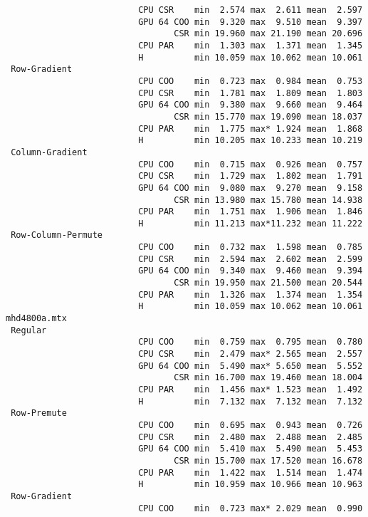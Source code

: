 \begin{verbatim}
                          CPU CSR    min  2.574 max  2.611 mean  2.597
                          GPU 64 COO min  9.320 max  9.510 mean  9.397
                                 CSR min 19.960 max 21.190 mean 20.696
                          CPU PAR    min  1.303 max  1.371 mean  1.345
                          H          min 10.059 max 10.062 mean 10.061
 Row-Gradient
                          CPU COO    min  0.723 max  0.984 mean  0.753
                          CPU CSR    min  1.781 max  1.809 mean  1.803
                          GPU 64 COO min  9.380 max  9.660 mean  9.464
                                 CSR min 15.770 max 19.090 mean 18.037
                          CPU PAR    min  1.775 max* 1.924 mean  1.868
                          H          min 10.205 max 10.233 mean 10.219
 Column-Gradient
                          CPU COO    min  0.715 max  0.926 mean  0.757
                          CPU CSR    min  1.729 max  1.802 mean  1.791
                          GPU 64 COO min  9.080 max  9.270 mean  9.158
                                 CSR min 13.980 max 15.780 mean 14.938
                          CPU PAR    min  1.751 max  1.906 mean  1.846
                          H          min 11.213 max*11.232 mean 11.222
 Row-Column-Permute
                          CPU COO    min  0.732 max  1.598 mean  0.785
                          CPU CSR    min  2.594 max  2.602 mean  2.599
                          GPU 64 COO min  9.340 max  9.460 mean  9.394
                                 CSR min 19.950 max 21.500 mean 20.544
                          CPU PAR    min  1.326 max  1.374 mean  1.354
                          H          min 10.059 max 10.062 mean 10.061
mhd4800a.mtx
 Regular
                          CPU COO    min  0.759 max  0.795 mean  0.780
                          CPU CSR    min  2.479 max* 2.565 mean  2.557
                          GPU 64 COO min  5.490 max* 5.650 mean  5.552
                                 CSR min 16.700 max 19.460 mean 18.004
                          CPU PAR    min  1.456 max* 1.523 mean  1.492
                          H          min  7.132 max  7.132 mean  7.132
 Row-Premute
                          CPU COO    min  0.695 max  0.943 mean  0.726
                          CPU CSR    min  2.480 max  2.488 mean  2.485
                          GPU 64 COO min  5.410 max  5.490 mean  5.453
                                 CSR min 15.700 max 17.520 mean 16.678
                          CPU PAR    min  1.422 max  1.514 mean  1.474
                          H          min 10.959 max 10.966 mean 10.963
 Row-Gradient
                          CPU COO    min  0.723 max* 2.029 mean  0.990

\end{verbatim}

